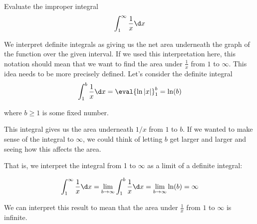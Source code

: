 \documentclass{ximera}
\begin{document}
\begin{example}
Evaluate the improper integral
\[ 
\int_{1}^{\infty} \frac{1}{x} \d x
\]
\begin{explanation}

We interpret definite integrals as giving us the net area underneath the graph of the function over the given interval. If we used this interpretation here, this notation should mean that we want to find the area under $\frac{1}{x}$ from $1$ to $\infty$.  This idea needs to be more precisely defined.  Let's consider the definite integral
\[
\int_{1}^{b} \frac{1}{x} \d x=\eval{\ln|x|}_{1}^{b}=\ln(b)
\]

where $b \geq 1$ is some fixed number. 

\begin{image}
\end{image}


 This integral gives us the area underneath $1/x$ from $1$ to $b$. If we wanted to make sense of the integral to $\infty$, we could think of letting $b$ 
get larger and larger and seeing how this affects the area. 

That is, we interpret the integral from 1 to $\infty$ as a limit of a definite integral:

\[
\int_{1}^{\infty} \frac{1}{x} \d x= \lim_{b \to \infty} \int_{1}^{b} \frac{1}{x} \d x= \lim_{b \to \infty} \ln(b) = \infty
\]

We can interpret this result to mean that the area under $\frac{1}{x}$ from $1$ to $\infty$ is infinite.
\end{explanation}
\end{example}
\end{document}
